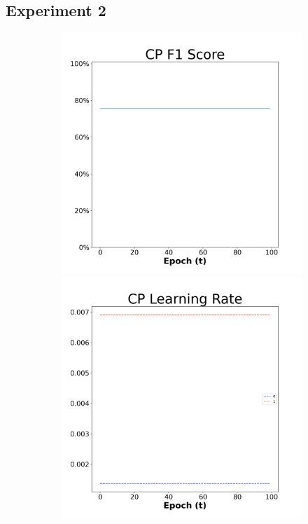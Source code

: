 \subsection*{Experiment 2}


\begin{figure}[H]
    \centering %
\begin{subfigure}{0.3\textwidth}
  \includegraphics[width=\linewidth]{images/exper2/NSP/CP_0.01_f1.png}
    \includegraphics[width=\linewidth]{images/exper2/NSP/CP_0.01_lr.png}

\end{subfigure}
\end{figure}
